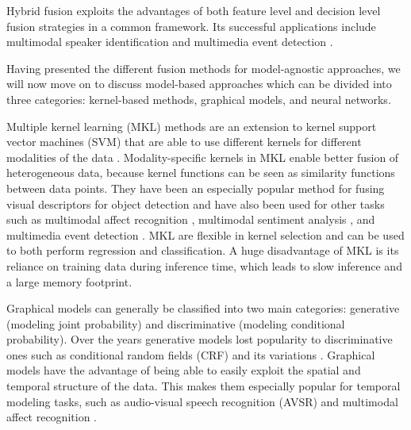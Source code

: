 \documentclass{article}
\begin{document}
Hybrid fusion exploits the advantages of both feature level and decision level fusion strategies in a common framework. Its successful applications include multimodal speaker identification \citep{wu2005speaker} and multimedia event detection \citep{lan2014multimedia}.

Having presented the different fusion methods for model-agnostic approaches, we will now move on to discuss model-based approaches which can be divided into three categories: kernel-based methods, graphical models, and neural networks.

Multiple kernel learning (MKL) methods are an extension to kernel support vector machines (SVM) that are able to use different kernels for different modalities of the data \citep{goenen2011kernel}. Modality-specific kernels in MKL enable better fusion of heterogeneous data, because kernel functions can be seen as similarity functions between data points. They have been an especially popular method for fusing visual descriptors for object detection \citep{bucak2014kernel, gehler2009kernel, krizhevsky2012imagenet} and have also been used for other tasks such as multimodal affect recognition \citep{chen2014recog, jaques2015multi, sikka2013multiple}, multimodal sentiment analysis \citep{poria2015deep}, and multimedia event detection \citep{yeh2012novel}. MKL are flexible in kernel selection and can be used to both perform regression and classification. A huge disadvantage of MKL is its reliance on training data during inference time, which leads to slow inference and a large memory footprint.

Graphical models can generally be classified into two main categories: generative (modeling joint probability) and discriminative (modeling conditional probability). Over the years generative models lost popularity to discriminative ones such as conditional random fields (CRF) \citep{lafferty2001crf} and its variations \citep{quattoni2007hcrf, song2012multi, qin2009global}. Graphical models have the advantage of being able to easily exploit the spatial and temporal structure of the data. This makes them especially popular for temporal modeling tasks, such as audio-visual speech recognition (AVSR) \citep{gurban2008dynamic} and multimodal affect recognition \citep{baltrusaitis2013dimensional}.
\end{document}
